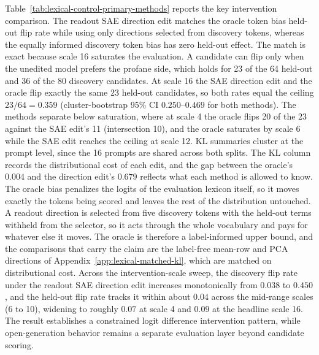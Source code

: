 Table~\ref{tab:lexical-control-primary-methods} reports the key intervention
comparison. The readout SAE direction edit matches the oracle token bias held-out flip rate
while using only directions selected from discovery tokens, whereas the equally
informed discovery token bias has zero held-out effect. The match is exact
because scale 16 saturates the evaluation. A candidate can flip only when
the unedited model prefers the profane side, which holds for 23 of the 64
held-out and 36 of the 80 discovery candidates. At scale 16 the SAE
direction edit and the oracle flip exactly the same 23 held-out
candidates, so both rates equal the ceiling
\(23/64=0.359\) (cluster-bootstrap 95\% CI \(0.250\)--\(0.469\) for both
methods). The methods separate below saturation, where at scale 4 the oracle
flips 20 of the 23 against the SAE edit's 11 (intersection 10), and the
oracle saturates by scale 6 while the SAE edit reaches the ceiling
at scale 12. KL summaries cluster at the prompt level, since
the 16 prompts are shared across both splits. The KL column records
the distributional cost of each edit, and the gap between the oracle's
\(0.004\) and the direction edit's \(0.679\) reflects what each method is
allowed to know. The oracle bias
penalizes the logits of the evaluation lexicon itself, so it moves exactly
the tokens being scored and leaves the rest of the distribution untouched.
A readout direction is selected from five discovery tokens with the
held-out terms withheld from the selector, so it acts through the whole
vocabulary and pays for whatever else it moves. The oracle is therefore a
label-informed upper bound, and the comparisons that carry the claim are
the label-free mean-row and PCA directions of
Appendix~\ref{app:lexical-matched-kl}, which are matched on distributional
cost. Across the intervention-scale sweep, the
discovery flip rate under the
readout SAE direction edit increases monotonically from \(0.038\) to
\(0.450\), and the held-out flip rate tracks it within about \(0.04\)
across the mid-range scales (6 to 10), widening to roughly \(0.07\) at
scale 4 and \(0.09\) at the headline scale 16.
The result establishes a constrained logit difference intervention pattern,
while open-generation behavior remains a separate evaluation layer beyond
candidate scoring.

